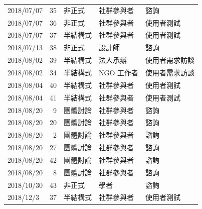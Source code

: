 \documentclass[12pt,a4paper]{article}
\begin{document}
\begin{table}[htbp]
\begin{tabular}{lrlll}
2018/07/07 & 35 & 非正式 & 社群參與者 & 諮詢\\
2018/07/07 & 36 & 非正式 & 社群參與者 & 使用者測試\\
2018/07/07 & 37 & 半結構式 & 社群參與者 & 使用者測試\\
2018/07/13 & 38 & 非正式 & 設計師 & 諮詢\\
2018/08/02 & 39 & 半結構式 & 法人承辦 & 使用者需求訪談\\
2018/08/02 & 34 & 半結構式 & NGO 工作者 & 使用者需求訪談\\
2018/08/04 & 40 & 半結構式 & 社群參與者 & 使用者測試\\
2018/08/04 & 41 & 半結構式 & 社群參與者 & 使用者測試\\
2018/08/20 & 9 & 團體討論 & 社群參與者 & 諮詢\\
2018/08/20 & 20 & 團體討論 & 社群參與者 & 諮詢\\
2018/08/20 & 2 & 團體討論 & 社群參與者 & 諮詢\\
2018/08/20 & 27 & 團體討論 & 社群參與者 & 諮詢\\
2018/08/20 & 42 & 團體討論 & 社群參與者 & 諮詢\\
2018/08/20 & 8 & 團體討論 & 社群參與者 & 諮詢\\
2018/10/30 & 43 & 非正式 & 學者 & 諮詢\\
2018/12/3 & 37 & 半結構式 & 社群參與者 & 使用者測試\\
\bottomrule
\end{tabular}
\end{table}
\end{document}
